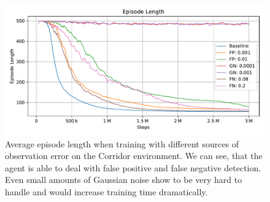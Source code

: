 \begin{figure}[htp]
    \begin{center}
        \includegraphics[clip, width=0.9\columnwidth]{figures/evaluation/error/observation_error_ep_len.pdf}
    \end{center}
    \caption[Episode Length During Training with Observation Error]{Average episode length when training with different sources of observation error on the Corridor environment. We can see, that the agent is able to deal with false positive and false negative detection. Even small amounts of Gaussian noise show to be very hard to handle and would increase training time dramatically.} \label{fig:Eval/Error/ObsTrain}
\end{figure}

